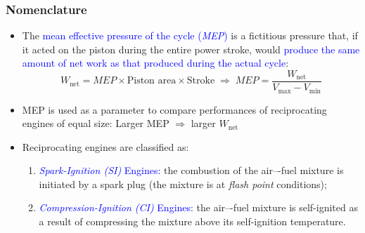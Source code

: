 \documentclass[10pt,compress]{beamer}
\begin{document}
\begin{frame}
 \frametitle{Nomenclature}
   \begin{itemize}
    \item <1-> The \textcolor{blue}{mean effective pressure of the cycle ({\it MEP})} is a fictitious pressure that, if it acted on the piston during the entire power stroke, would \textcolor{blue}{produce the same amount of net work as that produced during the actual cycle}:
        \begin{displaymath}
          W_{\text{net}} =MEP \times \text{Piston area} \times \text{Stroke} \; \Longrightarrow \; MEP= \displaystyle\frac{W_{\text{net}}}{V_{\text{max}}-V_{\text{min}}}
        \end{displaymath}
    \item <2-> MEP is used as a parameter to compare performances of reciprocating engines of equal size:  Larger MEP $\Longrightarrow$ larger $W_{\text{net}}$
    \item <3-> Reciprocating engines are classified as:
     \begin{enumerate}
      \item <4->  \textcolor{blue}{{\it Spark-Ignition (SI)} Engines:} the combustion of the air–-fuel mixture is initiated by a spark plug (the mixture is at {\it flash point} conditions);
      \item <5->  \textcolor{blue}{{\it Compression-Ignition (CI)} Engines:} the air–-fuel mixture is self-ignited as a result of compressing the mixture above its self-ignition temperature.
     \end{enumerate}
   \end{itemize}
\end{frame}


\end{document}
